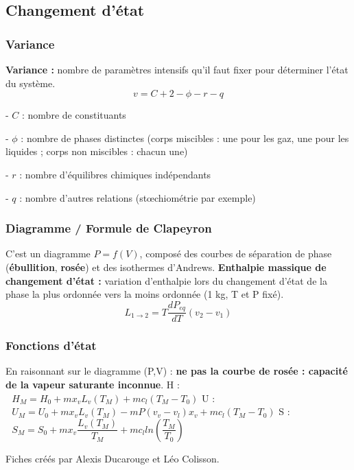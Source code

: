\documentclass[9pt,twocolumn]{article}
\begin{document}
\setlength{\columnseprule}{0.1pt}
\begin{center}
\part*{Changement d'état}
\end{center}
\section{Variance}

\textbf{Variance :} nombre de paramètres intensifs qu'il faut fixer pour déterminer l'état du système.
$$v=C+2-\phi-r-q$$

 
 - $C$ : nombre de constituants
 
 - $\phi$ : nombre de phases distinctes (corps miscibles : une pour les gaz, une pour les liquides ; corps non miscibles : chacun une)
 
 - $r$ : nombre d'équilibres chimiques indépendants
 
 - $q$ : nombre d'autres relations (stœchiométrie par exemple)
 
 \section{Diagramme / Formule de Clapeyron}
 
 C'est un diagramme $P=f(V)$, composé des courbes de séparation de phase (\textbf{ébullition}, \textbf{rosée}) et des isothermes d'Andrews.
 \bigbreak
\textbf{ Enthalpie massique de changement d'état :} variation d'enthalpie lors du changement d'état de la phase la plus ordonnée vers la moins ordonnée (1 kg, T et P fixé).
$$ \boxed{L_{1\rightarrow 2}=T\dfrac{dP_{eq}}{dT}(v_2-v_1)}$$ 
 
 \section{Fonctions d'état}

En raisonnant sur le diagramme (P,V) : \textbf{ne pas la courbe de rosée : capacité de la vapeur saturante inconnue}.
\medbreak
H : $ \>\>\> H_M = H_0 + m x_v L_v(T_M) + m c_l (T_M - T_0)$
 \medbreak
U : $ \>\>\> U_M = U_0 + m x_v L_v(T_M)  - m P (v_v-v_l) x_v+ m c_l (T_M - T_0)$
\smallbreak
 S : $ \>\>\> S_M = S_0 + m x_v \dfrac{L_v(T_M)}{T_M} + m c_l ln \left(\dfrac{T_M}{T_0}\right)$

\vfill
\footnotesize{Fiches créés par Alexis Ducarouge et Léo Colisson.}
\end{document}
